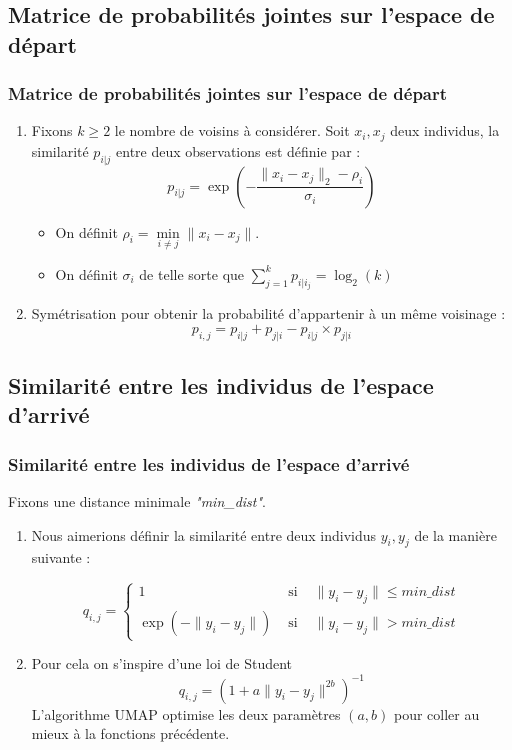 \documentclass{beamer}
\theoremstyle{definition}
\begin{document}
\subsection{Matrice de probabilités jointes sur l'espace de départ}
\begin{frame}
\frametitle{Matrice de probabilités jointes sur l'espace de départ}
\begin{enumerate}
	\item Fixons $k\geq 2$ le nombre de voisins à considérer. Soit $x_i,x_j$ deux individus, la similarité $p_{i|j}$ entre deux observations est définie par :$$p_{i|j} = \exp\left(-\dfrac{\|x_i -x_j\|_2-\rho_i}{\sigma_i}\right)$$

	\begin{itemize}
		\item  On définit $\rho_i = \underset{i\neq j}{\min}\|x_i-x_j\|$.
		\item On définit $\sigma_i$ de telle sorte que $\displaystyle \sum_{j=1}^{k}p_{i|i_j} = \log_2(k)$
	\end{itemize}
	\item Symétrisation pour obtenir la probabilité d'appartenir à un même voisinage : 
	$$p_{i,j} = p_{i|j} + p_{j|i} - p_{i|j} \times p_{j|i}$$ 
\end{enumerate}


	
\end{frame}

\subsection{Similarité entre les individus de l'espace d'arrivé}
\begin{frame}
	\frametitle{Similarité entre les individus de l'espace d'arrivé}
	Fixons une distance minimale \textit{"min\_dist"}.
	\begin{enumerate}
		\item Nous aimerions définir la similarité entre deux individus $y_i,y_j$ de la manière suivante : 
		
	 $$q_{i,j} = \left\{ \begin{array}{ccc}
			1 &\text{ si } & \|y_i-y_j\|\leq \textit{min\_dist}\\
			\exp(-\|y_i-y_j\|) &\text{ si } & \|y_i-y_j\|> \textit{min\_dist}
		\end{array}\right.$$
	
		\item Pour cela on s'inspire d'une loi de Student
		$$q_{i,j} = \left(1+ a\|y_i-y_j\|^{2b}\right)^{-1}$$ 
		L'algorithme UMAP optimise les deux paramètres $(a,b)$ pour coller au mieux à la fonctions précédente.  
	\end{enumerate}
	
	
\end{frame}
\end{document}
